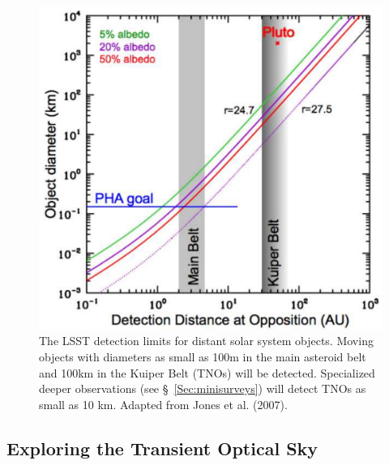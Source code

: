 \documentclass{emulateapj}
\begin{document}
\begin{figure}
\includegraphics[width=1.0\hsize,clip]{Af9.pdf}
\caption{The LSST detection limits for distant solar system objects.
Moving objects with diameters as small as 100m in the main asteroid belt and 
100km in the Kuiper Belt (TNOs) will be detected. Specialized deeper observations 
(see \S~\ref{Sec:minisurveys}) will detect TNOs as small as 10 km. Adapted from 
Jones et al. (2007).} 
\label{Fig:Af9}
\end{figure}


\subsection{ Exploring the Transient Optical Sky }
\end{document}
